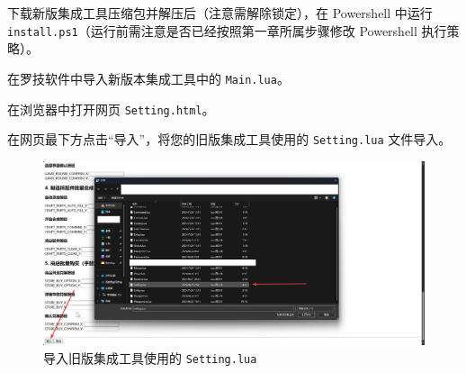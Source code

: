 






下载新版集成工具压缩包并解压后（注意需解除锁定），在 Powershell 中运行 \lstinline{install.ps1}（运行前需注意是否已经按照第一章所属步骤修改 Powershell 执行策略）。

在罗技软件中导入新版本集成工具中的 \lstinline{Main.lua}。

在浏览器中打开网页 \lstinline{Setting.html}。

在网页最下方点击“导入”，将您的旧版集成工具使用的 \lstinline{Setting.lua} 文件导入。

\begin{figure}[H]
    \Centering
    \includegraphics[width=\textwidth]{docs/assets/update/import_setting}
    \caption{导入旧版集成工具使用的 \lstinline{Setting.lua}}
\end{figure}

